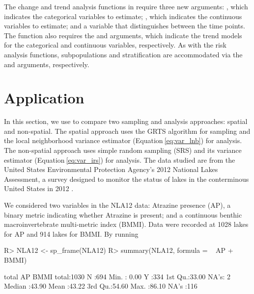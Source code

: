 \documentclass[
  shortnames]{jss}
\begin{document}
The change and trend analysis functions in  require three
new arguments: , which indicates the categorical
variables to estimate; , which indicates the continuous
variables to estimate; and a  variable that distinguishes
between the time points. The  function also
requires the  and  arguments, which
indicate the trend models for the categorical and continuous variables,
respectively. As with the risk analysis functions, subpopulations and
stratification are accommodated via the  and
 arguments, respectively.

\hypertarget{sec:application}{%
\section{Application}\label{sec:application}}

In this section, we use  to compare two sampling and
analysis approaches: spatial and non-spatial. The spatial approach uses
the GRTS algorithm for sampling and the local neighborhood variance
estimator (Equation\(~\)\ref{eq:var_lnb}) for analysis. The non-spatial
approach uses simple random sampling (SRS) and its variance estimator
(Equation\(~\)\ref{eq:var_irs}) for analysis. The data studied are from
the United States Environmental Protection Agency's 2012 National Lakes
Assessment, a survey designed to monitor the status of lakes in the
conterminous United States in 2012 \citep{usepa2012NLA}.

We considered two variables in the NLA12 data: Atrazine presence (AP), a
binary metric indicating whether Atrazine is present; and a continuous
benthic macroinvertebrate multi-metric index (BMMI). Data were recorded
at 1028 lakes for AP and 914 lakes for BMMI. By running

\begin{CodeChunk}
\begin{CodeInput}
R> NLA12 <- sp_frame(NLA12)
R> summary(NLA12, formula = ~ AP + BMMI)
\end{CodeInput}
\begin{CodeOutput}
   total         AP           BMMI      
 total:1030   N   :694   Min.   : 0.00  
              Y   :334   1st Qu.:33.00  
              NA's:  2   Median :43.90  
                         Mean   :43.22  
                         3rd Qu.:54.60  
                         Max.   :86.10  
                         NA's   :116    
\end{CodeOutput}
\end{CodeChunk}
\end{document}
